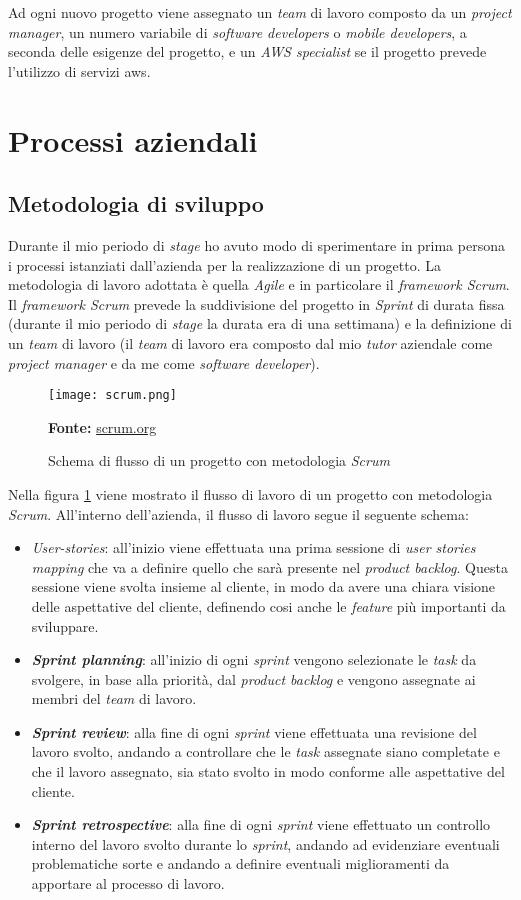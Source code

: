 \noindent
Ad ogni nuovo progetto viene assegnato un \textit{team} di lavoro composto da un \textit{project manager}, un numero variabile di \textit{software developers} o \textit{mobile developers}, a seconda delle esigenze del progetto, e un \textit{AWS specialist} se il progetto prevede l'utilizzo di servizi \gls{aws}. 
\pagebreak
\section{Processi aziendali}
\subsection{Metodologia di sviluppo}
Durante il mio periodo di \textit{stage} ho avuto modo di sperimentare in prima persona i processi istanziati dall'azienda per la realizzazione di un progetto.
La metodologia di lavoro adottata è quella \textit{Agile} e in particolare il \textit{framework Scrum}.\\ 
Il \textit{framework Scrum} prevede la suddivisione del progetto in \textit{Sprint} di durata fissa (durante il mio periodo di \textit{stage} la durata era di una settimana) e la definizione di un \textit{team} di lavoro (il \textit{team} di lavoro era composto dal mio \textit{tutor} aziendale come \textit{project manager} e da me come \textit{software developer}).
\begin{figure}[H]
    \centering
    \texttt{[image: scrum.png]}
    \caption{Schema di flusso di un progetto con metodologia \textit{Scrum}}
    \small \textbf{Fonte:} \url{scrum.org}
    \label{fig:scrum}
\end{figure}
\noindent
Nella figura \ref{fig:scrum} viene mostrato il flusso di lavoro di un progetto con metodologia \textit{Scrum}. All'interno dell'azienda, il flusso di lavoro segue il seguente schema:
\begin{itemize}
    \item \textit{\gls{User-stories}}: all'inizio viene effettuata una prima sessione di \textit{user stories mapping} che va a definire quello che sarà presente nel \textit{product backlog}. Questa sessione viene svolta insieme al cliente, in modo da avere una chiara visione delle aspettative del cliente, definendo cosi anche le \textit{feature} più importanti da sviluppare.
    \item \textbf{\textit{Sprint planning}}: all'inizio di ogni \textit{sprint} vengono selezionate le \textit{task} da svolgere, in base alla priorità, dal \textit{product backlog} e vengono assegnate ai membri del \textit{team} di lavoro.
    \item \textbf{\textit{Sprint review}}: alla fine di ogni \textit{sprint} viene effettuata una revisione del lavoro svolto, andando a controllare che le \textit{task} assegnate siano completate e che il lavoro assegnato, sia stato svolto in modo conforme alle aspettative del cliente.
    \item \textbf{\textit{Sprint retrospective}}: alla fine di ogni \textit{sprint} viene effettuato un controllo interno del lavoro svolto durante lo \textit{sprint}, andando ad evidenziare eventuali problematiche sorte e andando a definire eventuali miglioramenti da apportare al processo di lavoro.
\end{itemize}
